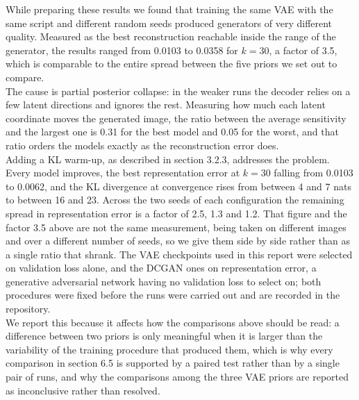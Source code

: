 While preparing these results we found that training the same VAE with the same script and different random seeds produced generators of very different quality. Measured as the best reconstruction reachable inside the range of the generator, the results ranged from 0.0103 to 0.0358 for \( k = 30 \), a factor of 3.5, which is comparable to the entire spread between the five priors we set out to compare.
\\
The cause is partial posterior collapse: in the weaker runs the decoder relies on a few latent directions and ignores the rest. Measuring how much each latent coordinate moves the generated image, the ratio between the average sensitivity and the largest one is 0.31 for the best model and 0.05 for the worst, and that ratio orders the models exactly as the reconstruction error does.
\\
Adding a KL warm-up, as described in section 3.2.3, addresses the problem. Every model improves, the best representation error at \( k = 30 \) falling from 0.0103 to 0.0062, and the KL divergence at convergence rises from between 4 and 7 nats to between 16 and 23. Across the two seeds of each configuration the remaining spread in representation error is a factor of 2.5, 1.3 and 1.2. That figure and the factor 3.5 above are not the same measurement, being taken on different images and over a different number of seeds, so we give them side by side rather than as a single ratio that shrank. The VAE checkpoints used in this report were selected on validation loss alone, and the DCGAN ones on representation error, a generative adversarial network having no validation loss to select on; both procedures were fixed before the runs were carried out and are recorded in the repository.
\\
We report this because it affects how the comparisons above should be read: a difference between two priors is only meaningful when it is larger than the variability of the training procedure that produced them, which is why every comparison in section 6.5 is supported by a paired test rather than by a single pair of runs, and why the comparisons among the three VAE priors are reported as inconclusive rather than resolved.

